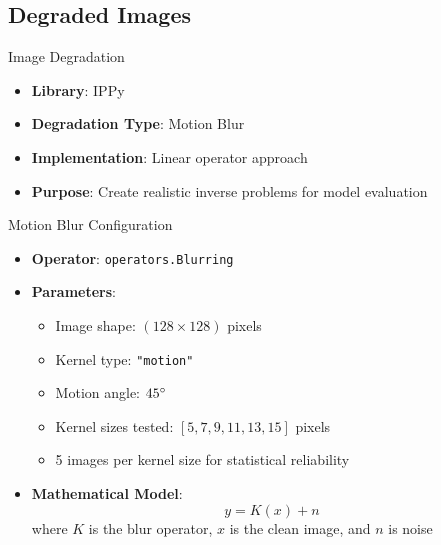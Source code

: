 \subsection{Degraded Images}

\begin{frame}{Image Degradation}
    \begin{itemize}
        \item \textbf{Library}: IPPy
        \item \textbf{Degradation Type}: Motion Blur
        \item \textbf{Implementation}: Linear operator approach
        \item \textbf{Purpose}: Create realistic inverse problems for model evaluation
    \end{itemize}
\end{frame}

\begin{frame}{Motion Blur Configuration}
    \begin{itemize}
        \item \textbf{Operator}: \texttt{operators.Blurring}
        \item \textbf{Parameters}:
              \begin{itemize}
                  \item Image shape: $(128 \times 128)$ pixels
                  \item Kernel type: \texttt{"motion"}
                  \item Motion angle: $45\degree$
                  \item Kernel sizes tested: $[5, 7, 9, 11, 13, 15]$ pixels
                  \item 5 images per kernel size for statistical reliability
              \end{itemize}
        \item \textbf{Mathematical Model}:
              \begin{equation}
                  y = K(x) + n
              \end{equation}
              where $K$ is the blur operator, $x$ is the clean image, and $n$ is noise
    \end{itemize}
\end{frame}